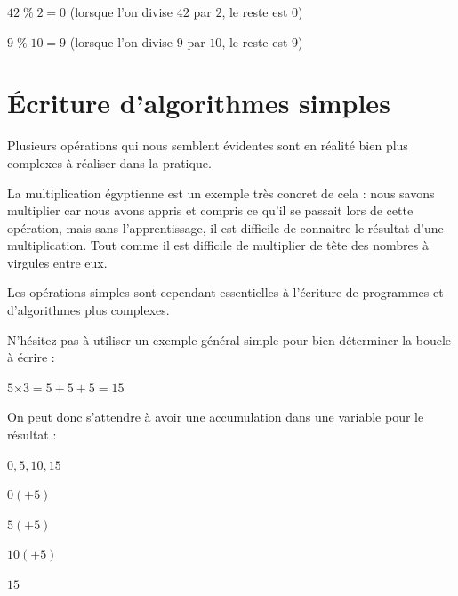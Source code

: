 \documentclass[11pt,a4paper]{article}
\begin{document}
$ 42 \; \% \; 2 = 0 $ (lorsque l'on divise $ 42 $ par $ 2 $, le reste est $ 0 $)

$ 9 \; \% \; 10 = 9 $ (lorsque l'on divise $ 9 $ par $ 10 $, le reste est $ 9 $)


\vfillLast

\newpage


\section{\'Ecriture d'algorithmes simples}

\bigskip

Plusieurs opérations qui nous semblent évidentes sont en réalité bien plus complexes à réaliser dans la pratique.

La multiplication égyptienne est un exemple très concret de cela : nous savons multiplier car nous avons appris et compris ce qu'il se passait lors de cette opération, mais sans l'apprentissage, il est difficile de connaitre le résultat d'une multiplication.
Tout comme il est difficile de multiplier de tête des nombres à virgules entre eux.

Les opérations simples sont cependant essentielles à l'écriture de programmes et d'algorithmes plus complexes.

\bigskip

\vspace*{3cm}

\bigskip


\bigskip

\vspace*{0.5cm}

\bigskip

N'hésitez pas à utiliser un exemple général simple pour bien déterminer la boucle à écrire :
\begin{center}

$ 5 \text{×} 3 = 5 + 5 + 5 = 15 $

\end{center}

\bigskip

On peut donc s'attendre à avoir une accumulation dans une variable pour le résultat :
\begin{center}

$ 0, 5, 10, 15 $

\bigskip

$ 0 (+ 5) $

$ 5 (+ 5) $

$ 10 (+ 5) $

$ 15 $
\end{center}
\end{document}
